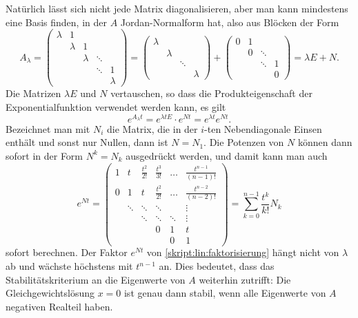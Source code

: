 Natürlich lässt sich nicht jede Matrix diagonalisieren, aber man kann
mindestens eine Basis finden, in der $A$ Jordan-Normalform hat, also aus
%
Blöcken der Form
\[
A_{\lambda}
=
\begin{pmatrix}
\lambda&   1   &       &       &       \\
       &\lambda&   1   &       &       \\
       &       &\lambda&\ddots &       \\
       &       &       &\ddots &    1  \\
       &       &       &       &\lambda
\end{pmatrix}
=
\begin{pmatrix}
\lambda&       &       &       \\
       &\lambda&       &       \\
       &       &\ddots &       \\
       &       &       &\lambda
\end{pmatrix}
+
\begin{pmatrix}
   0   &   1   &       &       \\
       &   0   &\ddots &       \\
       &       &\ddots &   1   \\
       &       &       &   0
\end{pmatrix}
=
\lambda E + N.
\]
Die Matrizen $\lambda E$ und $N$ vertauschen, so dass die
Produkteigenschaft der Exponentialfunktion verwendet werden kann,
es gilt
\begin{equation}
e^{A_\lambda t}
=
e^{\lambda tE}\cdot e^{Nt}
=
e^{\lambda t} e^{Nt}.
\label{skript:lin:faktorisierung}
\end{equation}
Bezeichnet man mit $N_i$ die Matrix, die in der $i$-ten Nebendiagonale
Einsen enthält und sonst nur Nullen, dann ist $N=N_1$.
Die Potenzen von $N$ können dann sofort in der Form $N^k=N_k$ ausgedrückt
werden, und damit kann man auch
\begin{equation}
e^{Nt}
=
\begin{pmatrix}
1&t&\frac{t^2}{2!}&\frac{t^3}{3!}& \dots & \frac{t^{n-1}}{(n-1)!}\\
0&1&       t      &\frac{t^2}{2!}& \dots & \frac{t^{n-2}}{(n-2)!}\\
      &\ddots&\ddots& \ddots     &       & \vdots                \\
      &      &\ddots& \ddots     &\ddots & \vdots                \\
      &      &      &         0  &    1  & t \\
      &      &      &            &    0  & 1
\end{pmatrix}
=
\sum_{k=0}^{n-1} \frac{t^k}{k!}N_k
\end{equation}
sofort berechnen.
Der Faktor $e^{Nt}$ von \eqref{skript:lin:faktorisierung}
hängt nicht von $\lambda$ ab und wächste höchstens mit $t^{n-1}$ an.
Dies bedeutet, dass das Stabilitätskriterium an die Eigenwerte von $A$
weiterhin zutrifft: Die Gleichgewichtslösung $x=0$ ist genau dann stabil,
wenn alle Eigenwerte von $A$ negativen Realteil haben.


